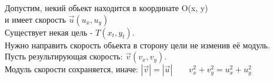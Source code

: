 \documentclass[14pt,a4paper]{scrartcl}
\theoremstyle{definition}
\theoremstyle{remark}
\theoremstyle{definition}
\theoremstyle{definition}
\begin{document}
\pagebreak
Допустим, некий обьект находится в координате O(x, y)\\ и имеет скорость $\vec{u}(u_x, u_y)$ \\
Существует некая цель - $T(x_t, y_t)$. \\Нужно направить скорость обьекта в сторону цели не изменив её модуль.\\
Пусть результирующая скорость: $\vec{v}(v_x, v_y)$.\\
Модуль скорости сохраняется, иначе: $ \left| \vec{v} \right| = \left| \vec{u} \right| \qquad v_x^2 + v_y^2 = u_x^2 + u_y^2    $
\end{document}
